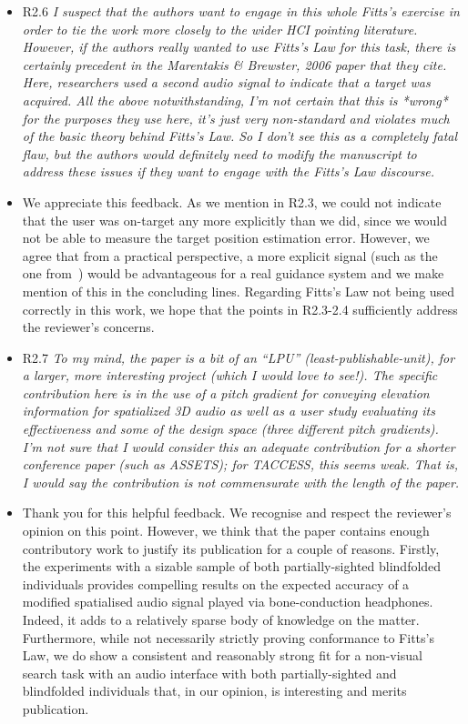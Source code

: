 \documentclass{scrartcl}
\begin{document}
\begin{itemize}
  \item R2.6 \textit{I suspect that the authors want to engage in this whole Fitts’s exercise in order to tie the work more closely to the wider HCI pointing literature. However, if the authors really wanted to use Fitts’s Law for this task, there is certainly precedent in the Marentakis \& Brewster, 2006 paper that they cite. Here, researchers used a second audio signal to indicate that a target was acquired.
    All the above notwithstanding, I’m not certain that this is *wrong* for the purposes they use here, it’s just very non-standard and violates much of the basic theory behind Fitts’s Law. So I don’t see this as a completely fatal flaw, but the authors would definitely need to modify the manuscript to address these issues if they want to engage with the Fitts’s Law discourse.}
  \item[] We appreciate this feedback.
    As we mention in R2.3, we could not indicate that the user was on-target any more explicitly than we did, since we would not be able to measure the target position estimation error.
    However, we agree that from a practical perspective, a more explicit signal (such as the one from~\cite{marentakis2005comparison}) would be advantageous for a real guidance system and we make mention of this in the concluding lines.
    Regarding Fitts's Law not being used correctly in this work, we hope that the points in R2.3-2.4 sufficiently address the reviewer's concerns.

  \item R2.7 \textit{To my mind, the paper is a bit of an ``LPU'' (least-publishable-unit), for a larger, more interesting project (which I would love to see!). The specific contribution here is in the use of a pitch gradient for conveying elevation information for spatialized 3D audio as well as a user study evaluating its effectiveness and some of the design space (three different pitch gradients). I’m not sure that I would consider this an adequate contribution for a shorter conference paper (such as ASSETS); for TACCESS, this seems weak. That is, I would say the contribution is not commensurate with the length of the paper.}
  \item[] Thank you for this helpful feedback.
    We recognise and respect the reviewer's opinion on this point.
    However, we think that the paper contains enough contributory work to justify its publication for a couple of reasons.
    Firstly, the experiments with a sizable sample of both partially-sighted blindfolded individuals provides compelling results on the expected accuracy of a modified spatialised audio signal played via bone-conduction headphones.
    Indeed, it adds to a relatively sparse body of knowledge on the matter.
    Furthermore, while not necessarily strictly proving conformance to Fitts's Law, we do show a consistent and reasonably strong fit for a non-visual search task with an audio interface with both partially-sighted and blindfolded individuals that, in our opinion, is interesting and merits publication.

\end{itemize}
\end{document}
